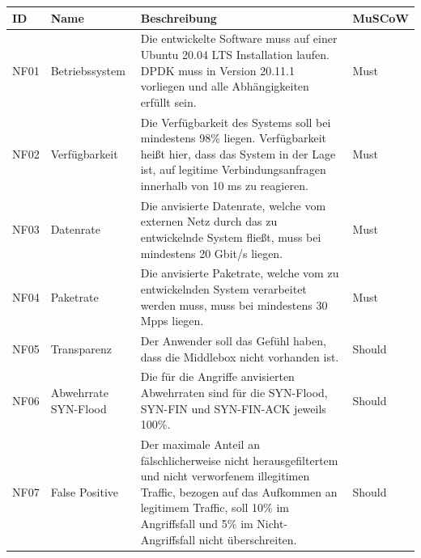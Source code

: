 \documentclass[../review_3.tex]{subfiles}
\begin{document}
\begin{longtable}[ht] { p{1cm} p{4cm} p{7cm} l }
    \toprule
    \textbf{ID} & \textbf{Name}        & \textbf{Beschreibung}                                                                                                                                                                                                                    & \textbf{MuSCoW} \\ \midrule \endhead
    NF01        & Betriebssystem       & Die entwickelte Software muss auf einer Ubuntu 20.04 LTS Installation laufen. DPDK muss in Version 20.11.1 vorliegen und alle Abhängigkeiten erfüllt sein.                                                                               & Must            \\
    NF02        & Verfügbarkeit        & Die Verfügbarkeit des Systems soll bei mindestens 98\% liegen. Verfügbarkeit heißt hier, dass das System in der Lage ist, auf legitime Verbindungsanfragen innerhalb von 10 ms zu reagieren.                                             & Must            \\
    NF03        & Datenrate            & Die anvisierte Datenrate, welche vom externen Netz durch das zu entwickelnde System fließt, muss bei mindestens 20 Gbit/s liegen.                                                                                                        & Must            \\
    NF04        & Paketrate            & Die anvisierte Paketrate, welche vom zu entwickelnden System verarbeitet werden muss, muss bei mindestens 30 Mpps liegen.                                                                                                                & Must            \\
    NF05        & Transparenz          & Der Anwender soll das Gefühl haben, dass die Middlebox nicht vorhanden ist.                                                                                                                                                              & Should          \\
    NF06        & Abwehrrate SYN-Flood & Die für die Angriffe anvisierten Abwehrraten sind für die SYN-Flood, SYN-FIN und SYN-FIN-ACK jeweils 100\%.                                                                                                                              & Should          \\
    NF07        & False Positive       & Der maximale Anteil an fälschlicherweise nicht herausgefiltertem und nicht verworfenem illegitimen Traffic, bezogen auf das Aufkommen an legitimem Traffic, soll 10\% im Angriffsfall und 5\% im Nicht-Angriffsfall nicht überschreiten. & Should          \\

\end{longtable}
\end{document}
